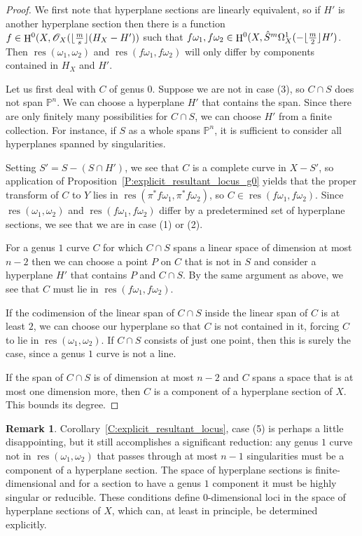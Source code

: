 \documentclass[12pt, reqno]{amsart}
\DeclarePairedDelimiter{\floor}{\lfloor}{\rfloor}
\theoremstyle{definition}
\newtheorem{rmk}[lemma]{Remark}
\newcommand{\PP}{{\mathbb P}}
\newcommand{\sO}{{\mathscr O}}
\DeclareMathOperator{\HH}{H}
\DeclareMathOperator{\res}{res}
\numberwithin{equation}{section}
\numberwithin{table}{section}
\begin{document}
\begin{proof}
We first note that hyperplane sections are linearly equivalent, so if $H'$ is another hyperplane section then there is a function $f\in \HH^0(X,\sO_X(\floor{\frac{m}{s}}(H_X-H'))$ such that $f\omega_1,f\omega_2\in \HH^0(X,\hat{S}^m\Omega^1_X(-\floor{\frac{m}{2}} H')$. Then $\res(\omega_1,\omega_2)$ and $\res(f\omega_1,f\omega_2)$ will only differ by components contained in $H_X$ and $H'$.

Let us first deal with $C$ of genus $0$. Suppose we are not in case (3), so $C\cap S$ does not span $\PP^n$.  We can choose a hyperplane $H'$ that contains the span. Since there are only finitely many possibilities for $C\cap S$, we can choose $H'$ from a finite collection. For instance, if $S$ as a whole spans $\PP^n$, it is sufficient to consider all hyperplanes spanned by singularities.

Setting $S'=S-(S\cap H')$, we see that $C$ is a complete curve in $X-S'$, so application of Proposition~\ref{P:explicit_resultant_locus_g0} yields that the proper transform of $C$ to $Y$ lies in $\res(\pi^* f\omega_1,\pi^* f\omega_2)$, so $C\in\res(f\omega_1,f\omega_2)$. Since $\res(\omega_1,\omega_2)$ and $\res(f\omega_1,f\omega_2)$ differ by a predetermined set of hyperplane sections, we see that we are in case (1) or (2).

For a genus $1$ curve $C$ for which $C\cap S$ spans a linear space of dimension at most $n-2$ then we can choose a point $P$ on $C$ that is not in $S$ and consider a hyperplane $H'$ that contains $P$ and $C\cap S$. By the same argument as above, we see that $C$ must lie in $\res(f\omega_1,f\omega_2)$. 

If the codimension of the linear span of $C\cap S$ inside the linear span of $C$ is at least $2$, we can choose our hyperplane so that $C$ is not contained in it, forcing $C$ to lie in $\res(\omega_1,\omega_2)$. If $C\cap S$ consists of just one point, then this is surely the case, since a genus $1$ curve is not a line.

If the span of $C\cap S$ is of dimension at most $n-2$ and $C$ spans a space that is at most one dimension more, then $C$ is a component of a hyperplane section of $X$. This bounds its degree.
\end{proof}

\begin{rmk}
Corollary~\ref{C:explicit_resultant_locus}, case (5) is perhaps a little disappointing, but it still accomplishes a significant reduction: any genus $1$ curve not in $\res(\omega_1,\omega_2)$ that passes through at most $n-1$ singularities must be a component of a hyperplane section. 
The space of hyperplane sections is finite-dimensional and for a section to have a genus $1$ component it must be highly singular or reducible. These conditions define $0$-dimensional loci in the space of hyperplane sections of $X$, which can, at least in principle, be determined explicitly. 
\end{rmk}
\end{document}

